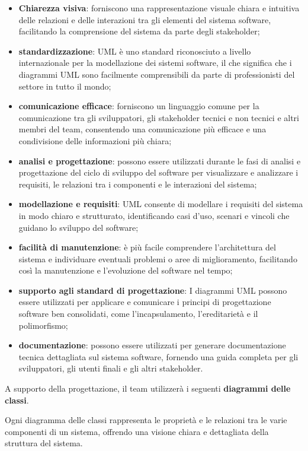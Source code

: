 \begin{itemize}
	\item \textbf{Chiarezza visiva}: forniscono una rappresentazione visuale chiara e intuitiva delle relazioni e delle interazioni tra gli elementi del sistema software, facilitando la comprensione del sistema da parte degli stakeholder;
	\item \textbf{standardizzazione}: UML è uno standard riconosciuto a livello internazionale per la modellazione dei sistemi software, il che significa che i diagrammi UML sono facilmente comprensibili da parte di professionisti del settore in tutto il mondo;
	\item \textbf{comunicazione efficace}: forniscono un linguaggio comune per la comunicazione tra gli sviluppatori, gli stakeholder tecnici e non tecnici e altri membri del team, consentendo una comunicazione più efficace e una condivisione delle informazioni più chiara;
	\item \textbf{analisi e progettazione}: possono essere utilizzati durante le fasi di analisi e progettazione del ciclo di sviluppo del software per visualizzare e analizzare i requisiti, le relazioni tra i componenti e le interazioni del sistema;
	\item \textbf{modellazione e requisiti}: UML consente di modellare i requisiti del sistema in modo chiaro e strutturato, identificando casi d'uso, scenari e vincoli che guidano lo sviluppo del software;
	\item \textbf{facilità di manutenzione}: è più facile comprendere l'architettura del sistema e individuare eventuali problemi o aree di miglioramento, facilitando così la manutenzione e l'evoluzione del software nel tempo;
	\item \textbf{supporto agli standard di progettazione}: I diagrammi UML possono essere utilizzati per applicare e comunicare i principi di progettazione software ben consolidati, come l'incapsulamento, l'ereditarietà e il polimorfismo;
	\item \textbf{documentazione}: possono essere utilizzati per generare documentazione tecnica dettagliata sul sistema software, fornendo una guida completa per gli sviluppatori, gli utenti finali e gli altri stakeholder.
\end{itemize}
\newpage
\begin{flushleft}
A supporto della progettazione, il team utilizzerà i seguenti \textbf{diagrammi delle classi}.
\end{flushleft}
Ogni diagramma delle classi rappresenta le proprietà e le relazioni tra le varie componenti di un sistema, offrendo una visione chiara e dettagliata della struttura del sistema.\\
